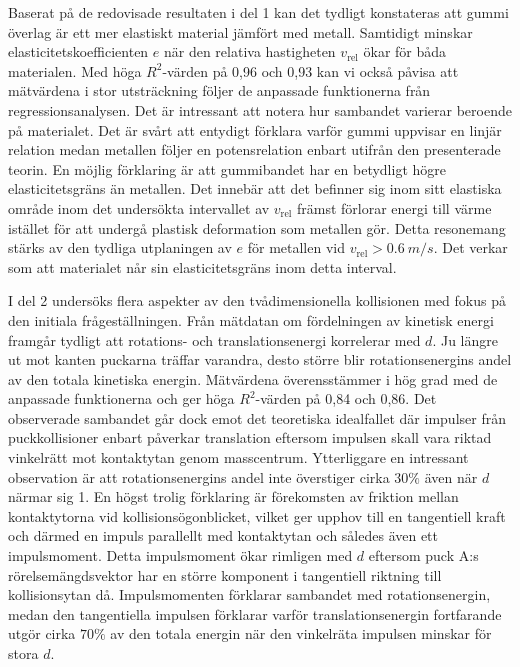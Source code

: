 Baserat på de redovisade resultaten i del 1 kan det tydligt konstateras att gummi överlag är ett mer elastiskt material jämfört med metall. Samtidigt minskar elasticitetskoefficienten \(e\) när den relativa hastigheten \(v_{\text{rel}}\) ökar för båda materialen. Med höga \(R^2\)-värden på 0,96 och 0,93 kan vi också påvisa att mätvärdena i stor utsträckning följer de anpassade funktionerna från regressionsanalysen. Det är intressant att notera hur sambandet varierar beroende på materialet. Det är svårt att entydigt förklara varför gummi uppvisar en linjär relation medan metallen följer en potensrelation enbart utifrån den presenterade teorin. En möjlig förklaring är att gummibandet har en betydligt högre elasticitetsgräns än metallen. Det innebär att det befinner sig inom sitt elastiska område inom det undersökta intervallet av \(v_{\text{rel}}\) främst förlorar energi till värme istället för att undergå plastisk deformation som metallen gör. Detta resonemang stärks av den tydliga utplaningen av \(e\) för metallen vid \(v_{\text{rel}} > \SI{0.6}{m/s}\). Det verkar som att materialet når sin elasticitetsgräns inom detta interval.

I del 2 undersöks flera aspekter av den tvådimensionella kollisionen med fokus på den initiala frågeställningen. Från mätdatan om fördelningen av kinetisk energi framgår tydligt att rotations- och translationsenergi korrelerar med \(d\). Ju längre ut mot kanten puckarna träffar varandra, desto större blir rotationsenergins andel av den totala kinetiska energin. Mätvärdena överensstämmer i hög grad med de anpassade funktionerna och ger höga \(R^2\)-värden på 0,84 och 0,86. Det observerade sambandet går dock emot det teoretiska idealfallet där impulser från puckkollisioner enbart påverkar translation eftersom impulsen skall vara riktad vinkelrätt mot kontaktytan genom masscentrum. Ytterliggare en intressant observation är att rotationsenergins andel inte överstiger cirka \(30\%\) även när \(d\) närmar sig 1. En högst trolig förklaring är förekomsten av friktion mellan kontaktytorna vid kollisionsögonblicket, vilket ger upphov till en tangentiell kraft och därmed en impuls parallellt med kontaktytan och således även ett impulsmoment. Detta impulsmoment ökar rimligen med \(d\) eftersom puck A:s rörelsemängdsvektor har en större komponent i tangentiell riktning till kollisionsytan då. Impulsmomenten förklarar sambandet med rotationsenergin, medan den tangentiella impulsen förklarar varför translationsenergin fortfarande utgör cirka \(70\%\) av den totala energin när den vinkelräta impulsen minskar för stora \(d\).

